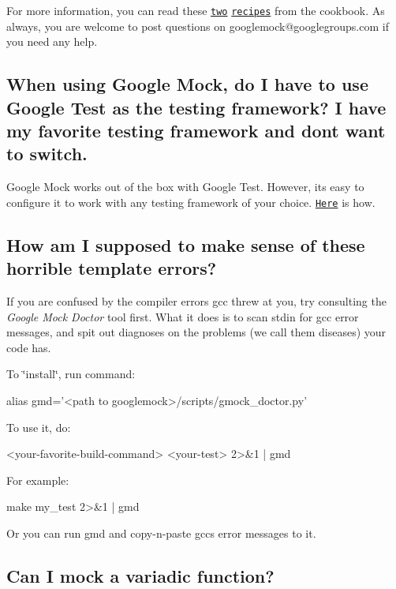 For more information, you can read these \href{http://code.google.com/p/googlemock/wiki/V1_7_CookBook#Writing_New_Monomorphic_Matchers}{\tt two} \href{http://code.google.com/p/googlemock/wiki/V1_7_CookBook#Writing_New_Polymorphic_Matchers}{\tt recipes} from the cookbook. As always, you are welcome to post questions on {\ttfamily googlemock@googlegroups.\+com} if you need any help.

\subsection*{When using Google Mock, do I have to use Google Test as the testing framework? I have my favorite testing framework and don\textquotesingle{}t want to switch.}

Google Mock works out of the box with Google Test. However, it\textquotesingle{}s easy to configure it to work with any testing framework of your choice. \href{http://code.google.com/p/googlemock/wiki/V1_7_ForDummies#Using_Google_Mock_with_Any_Testing_Framework}{\tt Here} is how.

\subsection*{How am I supposed to make sense of these horrible template errors?}

If you are confused by the compiler errors gcc threw at you, try consulting the {\itshape Google Mock Doctor} tool first. What it does is to scan stdin for gcc error messages, and spit out diagnoses on the problems (we call them diseases) your code has.

To \char`\"{}install\char`\"{}, run command\+: 
\begin{DoxyCode}
alias gmd='<path to googlemock>/scripts/gmock\_doctor.py'
\end{DoxyCode}


To use it, do\+: 
\begin{DoxyCode}
<your-favorite-build-command> <your-test> 2>&1 | gmd
\end{DoxyCode}


For example\+: 
\begin{DoxyCode}
make my\_test 2>&1 | gmd
\end{DoxyCode}


Or you can run {\ttfamily gmd} and copy-\/n-\/paste gcc\textquotesingle{}s error messages to it.

\subsection*{Can I mock a variadic function?}

